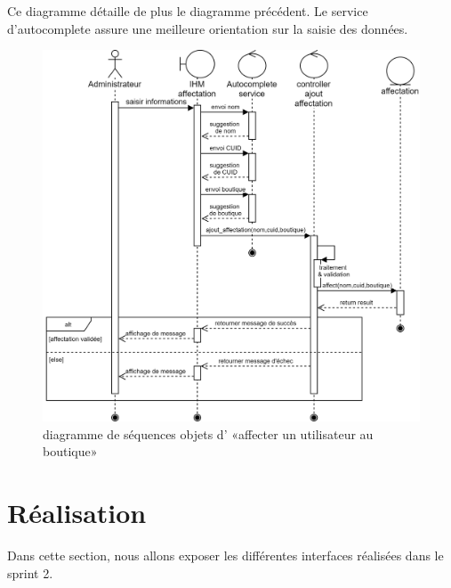 Ce diagramme détaille de plus le diagramme précédent. Le service d'autocomplete assure une meilleure orientation sur la saisie des données.
\begin{figure}[H]
	\centering
	\includegraphics[width=0.65\linewidth]{"img/conception/sequences/sprint 2/affectation-obj"}
	\caption[diagramme de séquences objets d’ «affecter un utilisateur au boutique»]{diagramme de séquences objets d’ «affecter un utilisateur au boutique»}
	\label{fig:affectation-obj}
\end{figure}



\section{Réalisation}
Dans cette section, nous allons exposer les différentes interfaces réalisées dans le sprint 2. 
